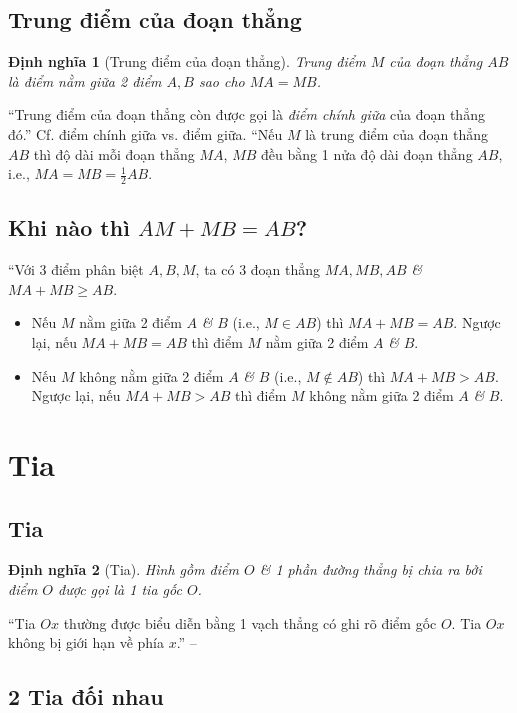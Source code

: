 \documentclass[oneside]{book}
\numberwithin{equation}{section}
\newtheorem{dinhnghia}{Định nghĩa}[section]
\begin{document}
\subsection{Trung điểm của đoạn thẳng}

\begin{dinhnghia}[Trung điểm của đoạn thẳng]
	\emph{Trung điểm $M$} của đoạn thẳng $AB$ là điểm nằm giữa 2 điểm $A,B$ sao cho $MA = MB$.
\end{dinhnghia}
``Trung điểm của đoạn thẳng còn được gọi là \textit{điểm chính giữa} của đoạn thẳng đó.'' Cf. điểm chính giữa vs. điểm giữa. ``Nếu $M$ là trung điểm của đoạn thẳng $AB$ thì độ dài mỗi đoạn thẳng $MA$, $MB$ đều bằng 1 nửa độ dài đoạn thẳng $AB$, i.e., $MA = MB = \frac{1}{2}AB$.

\subsection{Khi nào thì $AM + MB = AB$?}
``Với 3 điểm phân biệt $A,B,M$, ta có 3 đoạn thẳng $MA,MB,AB$ \textit{\&} $MA + MB\ge AB$.
\begin{itemize}
	\item Nếu $M$ nằm giữa 2 điểm $A$ \textit{\&} $B$ (i.e., $M\in AB$) thì $MA + MB = AB$. Ngược lại, nếu $MA + MB = AB$ thì điểm $M$ nằm giữa 2 điểm $A$ \textit{\&} $B$.
	\item Nếu $M$ không nằm giữa 2 điểm $A$ \textit{\&} $B$ (i.e., $M\notin AB$) thì $MA + MB > AB$. Ngược lại, nếu $MA + MB > AB$ thì điểm $M$ không nằm giữa 2 điểm $A$ \textit{\&} $B$.
\end{itemize}

\section{Tia}

\subsection{Tia}

\begin{dinhnghia}[Tia]
	Hình gồm điểm $O$ \textit{\&} 1 phần đường thẳng bị chia ra bởi điểm $O$ được gọi là 1 \textit{tia gốc $O$}.
\end{dinhnghia}
``Tia $Ox$ thường được biểu diễn bằng 1 vạch thẳng có ghi rõ điểm gốc $O$. Tia $Ox$ không bị giới hạn về phía $x$.'' -- \cite[p. 89]{Thai_Anh_Dat_Ha_Loan_Nam_Quang_Toan_6_tap_2}

\subsection{2 Tia đối nhau}
\end{document}

